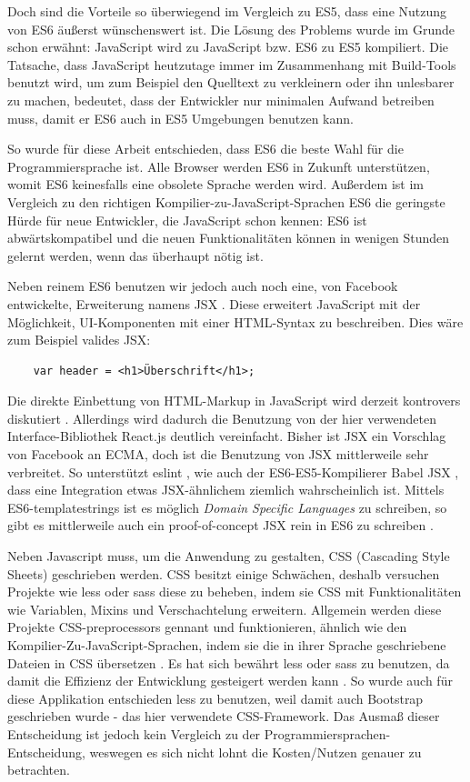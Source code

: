 \documentclass[12pt,twoside]{book}
\begin{document}
Doch sind die Vorteile so überwiegend im Vergleich zu ES5, dass eine Nutzung von ES6 äußerst wünschenswert ist.
Die Lösung des Problems wurde im Grunde schon erwähnt: JavaScript wird zu JavaScript bzw. ES6 zu ES5 kompiliert.
Die Tatsache, dass JavaScript heutzutage immer im Zusammenhang mit Build-Tools benutzt wird, um zum Beispiel den Quelltext zu verkleinern oder ihn unlesbarer zu machen, bedeutet, dass der Entwickler nur minimalen Aufwand betreiben muss, damit er ES6 auch in ES5 Umgebungen benutzen kann.

So wurde für diese Arbeit entschieden, dass ES6 die beste Wahl für die Programmiersprache ist. Alle Browser werden ES6 in Zukunft unterstützen, womit ES6 keinesfalls eine obsolete Sprache werden wird. Außerdem ist im Vergleich zu den richtigen Kompilier-zu-JavaScript-Sprachen ES6 die geringste Hürde für neue Entwickler, die JavaScript schon kennen: ES6 ist abwärtskompatibel und die neuen Funktionalitäten können in wenigen Stunden gelernt werden, wenn das überhaupt nötig ist.

Neben reinem ES6 benutzen wir jedoch auch noch eine, von Facebook entwickelte, Erweiterung namens JSX \cite{jsx}. Diese erweitert JavaScript mit der Möglichkeit, UI-Komponenten mit einer HTML-Syntax zu beschreiben. Dies wäre zum Beispiel valides JSX:

\begin{verbatim}
    var header = <h1>Überschrift</h1>;
\end{verbatim}

Die direkte Einbettung von HTML-Markup in JavaScript wird derzeit kontrovers diskutiert \cite{jsxcontrovers}. Allerdings wird dadurch die Benutzung von der hier verwendeten Interface-Bibliothek React.js deutlich vereinfacht.
Bisher ist JSX ein Vorschlag von Facebook an ECMA, doch ist die Benutzung von JSX mittlerweile sehr verbreitet. So unterstützt eslint \cite{eslint}, wie auch der ES6-ES5-Kompilierer Babel JSX \cite{babel}, dass eine Integration etwas JSX-ähnlichem ziemlich wahrscheinlich ist.
Mittels ES6-templatestrings ist es möglich \textit{Domain Specific Languages} zu schreiben, so gibt es mittlerweile auch ein proof-of-concept JSX rein in ES6 zu schreiben \cite{templatestrings}.

Neben Javascript muss, um die Anwendung zu gestalten, CSS (Cascading Style Sheets) geschrieben werden. CSS besitzt einige Schwächen, deshalb versuchen Projekte wie less \cite{less} oder sass \cite{sass} diese zu beheben, indem sie CSS mit Funktionalitäten wie Variablen, Mixins und Verschachtelung erweitern.
Allgemein werden diese Projekte CSS-preprocessors gennant und funktionieren,
ähnlich wie den Kompilier-Zu-JavaScript-Sprachen, indem sie die in ihrer Sprache geschriebene Dateien in CSS übersetzen \cite{csspre}.
Es hat sich bewährt less oder sass zu benutzen, da damit die Effizienz der Entwicklung gesteigert werden kann \cite{csspre}. So wurde auch für diese Applikation entschieden less zu benutzen, weil damit auch Bootstrap geschrieben wurde - das hier verwendete CSS-Framework.
Das Ausmaß dieser Entscheidung ist jedoch kein Vergleich zu der Programmiersprachen-Entscheidung, weswegen es sich nicht lohnt die Kosten/Nutzen genauer zu betrachten.
\end{document}
